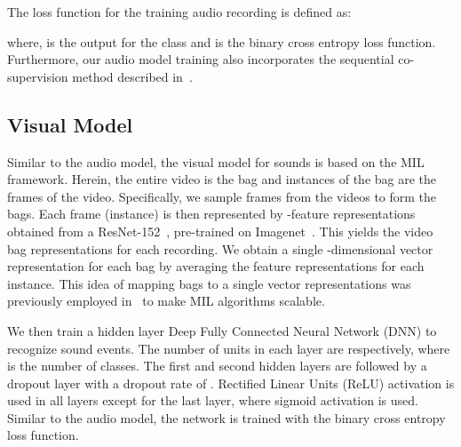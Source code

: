 \documentclass{article}
\begin{document}
The loss function for the  training audio recording is defined as:

where,  is the output for the  class and  is the binary cross entropy loss function.
Furthermore, our audio model training also incorporates the sequential co-supervision method described in~\cite{kumar2019secost}.

\subsection{Visual Model}\label{ssec:visual}

Similar to the audio model, the visual model for sounds is based on the MIL framework.
Herein, the entire video is the bag and instances of the bag are the frames of the video.
Specifically, we sample  frames from the videos to form the bags.
Each frame (instance) is then represented by -feature representations obtained from a ResNet-152~\cite{He2016}, pre-trained on Imagenet~\cite{Deng2009}.
This yields the video bag representations for each recording.
We obtain a single -dimensional vector representation for each bag by averaging the feature representations for each instance.
This idea of mapping bags to a single vector representations was previously employed in~\cite{kumar2016weaklysupervised,wei2014scalable} to make MIL algorithms scalable.

We then train a  hidden layer Deep Fully Connected Neural Network (DNN) to recognize sound events.
The number of units in each layer are  respectively, where  is the number of classes.
The first and second hidden layers are followed by a dropout layer with a dropout rate of .
Rectified Linear Units (ReLU) activation is used in all layers except for the last layer, where sigmoid activation is used. Similar to the audio model, the network is trained with the binary cross entropy loss function.
\end{document}
